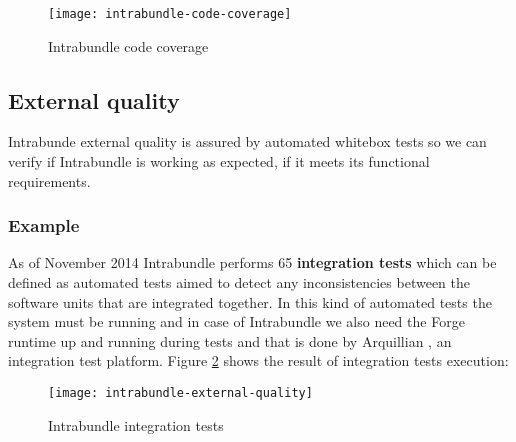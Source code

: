 \begin{figure}[h]
\caption{Intrabundle code coverage}
\label{intrabundle-code-cover}
\texttt{[image: intrabundle-code-coverage]}
\end{figure}

\FloatBarrier

\subsection{External quality}
Intrabunde external quality is assured by automated whitebox tests so we can verify if Intrabundle is working as expected, if it meets its functional requirements.

\subsubsection{Example}
As of November 2014 Intrabundle performs 65 \textbf{integration tests} which can be defined as automated tests aimed to detect any inconsistencies between the software units that are integrated together. In this kind of automated tests the system must be running and in case of Intrabundle we also need the Forge runtime up and running during tests and that is done by Arquillian \citep{dan 2011}, an integration test platform. Figure \ref{intrabundle-integ-tests} shows the result of integration tests execution:

\begin{figure}[h]
\caption{Intrabundle integration tests}
\label{intrabundle-integ-tests}
\texttt{[image: intrabundle-external-quality]}
\centering
\end{figure}

\FloatBarrier